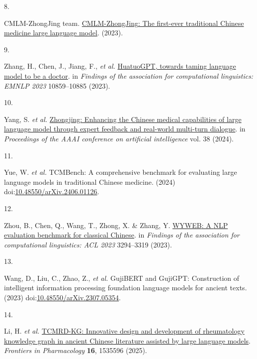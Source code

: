 \documentclass[
]{article}
\newlength{\cslhangindent}
\newlength{\csllabelwidth}
\newlength{\cslentryspacingunit} %
\newenvironment{CSLReferences}[2] %
 {%
  \setlength{\parindent}{0pt}
  \ifodd #1
  \let\oldpar\par
  \def\par{\hangindent=\cslhangindent\oldpar}
  \fi
  \setlength{\parskip}{#2\cslentryspacingunit}
 }%
 {}
\newcommand{\CSLLeftMargin}[1]{\parbox[t]{\csllabelwidth}{#1}}
\newcommand{\CSLRightInline}[1]{\parbox[t]{\linewidth - \csllabelwidth}{#1}\break}
\begin{document}
\begin{CSLReferences}{0}{0}
\leavevmode{}%
\CSLLeftMargin{8. }%
\CSLRightInline{CMLM-ZhongJing team.
\href{https://github.com/pariskang/CMLM-ZhongJing}{{CMLM-ZhongJing}: The
first-ever traditional {Chinese} medicine large language model}.
(2023).}

\leavevmode{}%
\CSLLeftMargin{9. }%
\CSLRightInline{Zhang, H., Chen, J., Jiang, F., \emph{et al.}
\href{https://aclanthology.org/2023.findings-emnlp.725}{{HuatuoGPT},
towards taming language model to be a doctor}. in \emph{Findings of the
association for computational linguistics: EMNLP 2023} 10859--10885
(2023).}

\leavevmode{}%
\CSLLeftMargin{10. }%
\CSLRightInline{Yang, S. \emph{et al.}
\href{https://doi.org/10.1609/aaai.v38i17.29907}{Zhongjing: Enhancing
the {Chinese} medical capabilities of large language model through
expert feedback and real-world multi-turn dialogue}. in
\emph{Proceedings of the AAAI conference on artificial intelligence}
vol. 38 (2024).}

\leavevmode{}%
\CSLLeftMargin{11. }%
\CSLRightInline{Yue, W. \emph{et al.} {TCMBench}: A comprehensive
benchmark for evaluating large language models in traditional {Chinese}
medicine. (2024)
doi:\href{https://doi.org/10.48550/arXiv.2406.01126}{10.48550/arXiv.2406.01126}.}

\leavevmode{}%
\CSLLeftMargin{12. }%
\CSLRightInline{Zhou, B., Chen, Q., Wang, T., Zhong, X. \& Zhang, Y.
\href{https://aclanthology.org/2023.findings-acl.204}{{WYWEB}: A {NLP}
evaluation benchmark for classical {Chinese}}. in \emph{Findings of the
association for computational linguistics: ACL 2023} 3294--3319 (2023).}

\leavevmode{}%
\CSLLeftMargin{13. }%
\CSLRightInline{Wang, D., Liu, C., Zhao, Z., \emph{et al.} {GujiBERT}
and {GujiGPT}: Construction of intelligent information processing
foundation language models for ancient texts. (2023)
doi:\href{https://doi.org/10.48550/arXiv.2307.05354}{10.48550/arXiv.2307.05354}.}

\leavevmode{}%
\CSLLeftMargin{14. }%
\CSLRightInline{Li, H. \emph{et al.}
\href{https://doi.org/10.3389/fphar.2025.1535596}{{TCMRD-KG}: Innovative
design and development of rheumatology knowledge graph in ancient
{Chinese} literature assisted by large language models}. \emph{Frontiers
in Pharmacology} \textbf{16}, 1535596 (2025).}


\end{CSLReferences}
\end{document}
